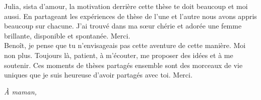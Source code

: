 Julia, sista 
d'amour, la motivation derrière cette thèse te doit beaucoup et moi aussi. En 
partageant les expériences de thèse de l'une et l'autre nous avons appris 
beaucoup 
sur chacune. J'ai trouvé dans ma sœur chérie et adorée une femme brillante, 
disponible et spontanée. Merci.
\\

Benoît, je pense que tu n'envisageais pas cette aventure de cette manière. Moi 
non plus. Toujours là, 
patient, à m'écouter, me proposer des idées et à me soutenir. Ces 
moments de thèses partagés ensemble sont des morceaux de vie uniques que je 
suis heureuse d'avoir partagés avec toi. Merci.

\clearpage
\pagebreak

\thispagestyle{empty}
\begin{flushright}
\textit{À maman,}
\end{flushright}

\pagebreak
